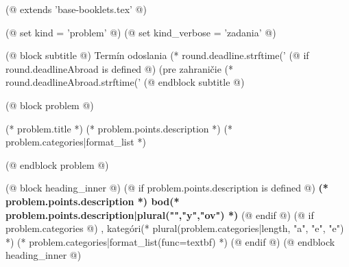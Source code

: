 (@ extends 'base-booklets.tex' @)

(@ set kind = 'problem' @)
(@ set kind_verbose = 'zadania' @)

(@ block subtitle @)
    {
        \centering
        \vspace*{-5mm}
        Termín odoslania (* round.deadline.strftime('%
        (@ if round.deadlineAbroad is defined @) (pre zahraničie (* round.deadlineAbroad.strftime('%
    }
(@ endblock subtitle @)

(@ block problem @)
    \begin{seminar-problem}%
        {(* problem.title *)}%
        {(* problem.points.description *)}%
        {(* problem.categories|format_list *)}
    \end{seminar-problem}
(@ endblock problem @)

(@ block heading_inner @)
    (@ if problem.points.description is defined @)%
        \textbf{(* problem.points.description *) bod(* problem.points.description|plural("","y","ov") *)}%
    (@ endif @)%
    (@ if problem.categories @)%
        , kategóri(* plural(problem.categories|length, "a", "e", "e") *) (* problem.categories|format_list(func=textbf) *)%
    (@ endif @)%
(@ endblock heading_inner @)
